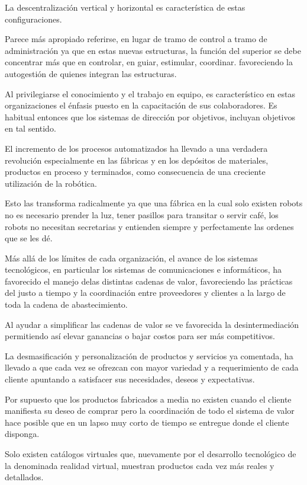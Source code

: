 \documentclass[a4paper, 12pt]{article}
\begin{document}
La descentralización vertical y horizontal es característica de estas configuraciones.

Parece más apropiado referirse, en lugar de tramo de control a tramo de administración ya que en estas nuevas estructuras, la función del superior se debe concentrar más que en controlar, en guiar, estimular, coordinar. favoreciendo la autogestión de quienes integran las estructuras.

Al privilegiarse el conocimiento y el trabajo en equipo, es característico en estas organizaciones el énfasis puesto en la capacitación de sus colaboradores. Es habitual entonces que los sistemas de dirección por objetivos, incluyan objetivos en tal sentido.

El incremento de los procesos automatizados ha llevado a una verdadera revolución especialmente en las fábricas y en los depósitos de materiales, productos en proceso y terminados, como consecuencia de una creciente utilización de la robótica.

Esto las transforma radicalmente ya que una fábrica en la cual solo existen robots no es necesario prender la luz, tener pasillos para transitar o servir café, los robots no necesitan secretarias y entienden siempre y perfectamente las ordenes que se les dé.

Más allá de los límites de cada organización, el avance de los sistemas tecnológicos, en particular los sistemas de comunicaciones e informáticos, ha favorecido el manejo delas distintas cadenas de valor, favoreciendo las prácticas del justo a tiempo y la  coordinación entre proveedores y clientes a la largo de toda la cadena de abastecimiento.

Al ayudar a simplificar las cadenas de valor se ve favorecida la desintermediación permitiendo así elevar ganancias o bajar costos para ser más competitivos.

La desmasificación y personalización de productos y servicios ya comentada, ha llevado a que cada vez se ofrezcan con mayor variedad y a requerimiento de cada cliente apuntando a satisfacer sus necesidades, deseos y expectativas.

Por supuesto que los productos fabricados a media no existen cuando el cliente manifiesta su deseo de comprar  pero la coordinación de todo el sistema de valor hace posible que en un lapso  muy corto de tiempo se entregue donde el cliente disponga.

Solo existen catálogos virtuales que, nuevamente por el desarrollo tecnológico de la denominada realidad virtual, muestran productos cada vez más reales y detallados.
\end{document}

